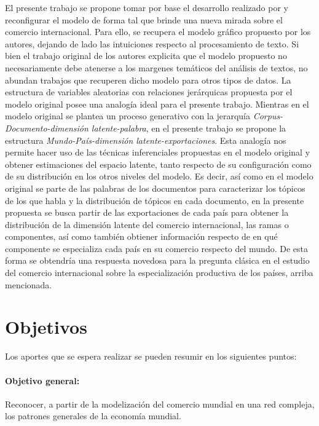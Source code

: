 \documentclass[runningheads,a4paper]{llncs}
\begin{document}
El presente trabajo se propone tomar por base el desarrollo realizado por \citet{LDA} y reconfigurar el modelo de forma tal que brinde una nueva mirada sobre el comercio internacional. Para ello, se recupera el modelo gráfico propuesto por los autores, dejando de lado las intuiciones respecto al procesamiento de texto. Si bien el trabajo original de los autores explicita que el modelo propuesto no necesariamente debe atenerse a los margenes temáticos del análisis de textos, no abundan trabajos que recuperen dicho modelo para otros tipos de datos. La estructura de variables aleatorias con relaciones jerárquicas propuesta por el modelo original posee una analogía ideal para el presente trabajo. Mientras en el modelo original se plantea un proceso generativo con la jerarquía \textit{Corpus-Documento-dimensión latente-palabra}, en el presente trabajo se propone la estructura \textit{Mundo-País-dimensión latente-exportaciones}. Esta analogía nos permite hacer uso de las técnicas inferenciales propuestas en el modelo original \citep{hoffman2013stochastic} y obtener estimaciones del espacio latente, tanto respecto de su configuración como de su distribución en los otros niveles del modelo. Es decir, así como en el modelo original se parte de las palabras de los documentos para caracterizar los tópicos de los que habla y la distribución de tópicos en cada documento, en la presente propuesta se busca partir de las exportaciones de cada país para obtener la distribución de la dimensión latente del comercio internacional, las ramas o componentes, así como también obtiener información respecto de en qué componente se especializa cada país en su comercio respecto del mundo. De esta forma se obtendría una respuesta novedosa para la pregunta clásica en el estudio del comercio internacional sobre la especialización productiva de los países, arriba mencionada. 


\section{Objetivos}

Los aportes que se espera realizar se pueden resumir en los siguientes puntos:

\par

\paragraph{\textbf{Objetivo general:}} Reconocer, a partir de la modelización del comercio mundial en una red compleja, los patrones generales de la economía mundial.
\end{document}
